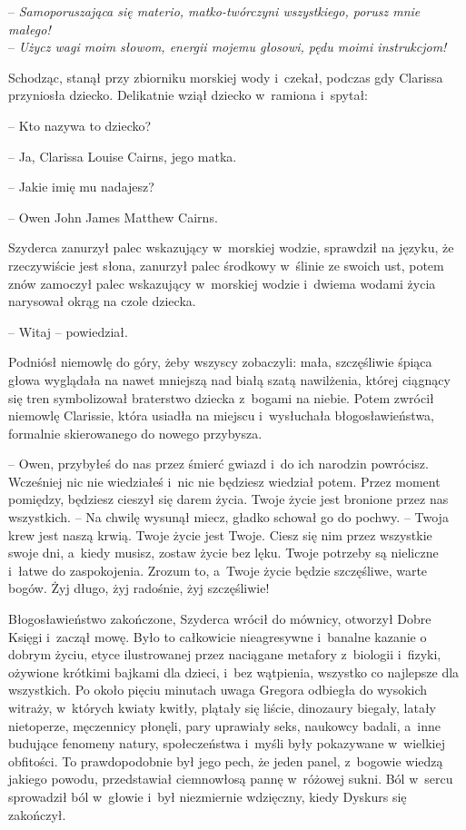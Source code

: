\documentclass[oneside,polish,12pt,sfheadings]{mwbk}
\begin{document}
-- \emph{Samoporuszająca się materio, matko-twórczyni wszystkiego, porusz
mnie małego!}\\

-- \emph{Użycz wagi moim słowom, energii mojemu głosowi, pędu moimi
instrukcjom!}

Schodząc, stanął przy zbiorniku morskiej wody i~czekał, podczas gdy
Clarissa przyniosła dziecko. Delikatnie wziął dziecko w~ramiona i~spytał:

-- Kto nazywa to dziecko?

-- Ja, Clarissa Louise Cairns, jego matka.

-- Jakie imię mu nadajesz?

-- Owen John James Matthew Cairns.

Szyderca zanurzył palec wskazujący w~morskiej wodzie, sprawdził na
języku, że rzeczywiście jest słona, zanurzył palec środkowy w~ślinie ze
swoich ust, potem znów zamoczył palec wskazujący w~morskiej wodzie i~dwiema wodami życia narysował okrąg na czole dziecka.

-- Witaj -- powiedział.

Podniósł niemowlę do góry, żeby wszyscy zobaczyli: mała, szczęśliwie
śpiąca głowa wyglądała na nawet mniejszą nad białą szatą nawilżenia,
której ciągnący się tren symbolizował braterstwo dziecka z~bogami na
niebie. Potem zwrócił niemowlę Clarissie, która usiadła na miejscu i~wysłuchała błogosławieństwa, formalnie skierowanego do nowego przybysza.

-- Owen, przybyłeś do nas przez śmierć gwiazd i~do ich narodzin
powrócisz. Wcześniej nic nie wiedziałeś i~nic nie będziesz wiedział
potem. Przez moment pomiędzy, będziesz cieszył się darem życia. Twoje
życie jest bronione przez nas wszystkich. -- Na chwilę wysunął miecz,
gładko schował go do pochwy. -- Twoja krew jest naszą krwią. Twoje życie
jest Twoje. Ciesz się nim przez wszystkie swoje dni, a~kiedy musisz,
zostaw życie bez lęku. Twoje potrzeby są nieliczne i~łatwe do
zaspokojenia. Zrozum to, a~Twoje życie będzie szczęśliwe, warte bogów.
Żyj długo, żyj radośnie, żyj szczęśliwie!

Błogosławieństwo zakończone, Szyderca wrócił do mównicy, otworzył Dobre
Księgi i~zaczął mowę. Było to całkowicie nieagresywne i~banalne kazanie
o dobrym życiu, etyce ilustrowanej przez naciągane metafory z~biologii i~fizyki, ożywione krótkimi bajkami dla dzieci, i~bez wątpienia, wszystko
co najlepsze dla wszystkich. Po około pięciu minutach uwaga Gregora
odbiegła do wysokich witraży, w~których kwiaty kwitły, plątały się
liście, dinozaury biegały, latały nietoperze, męczennicy płonęli, pary
uprawiały seks, naukowcy badali, a~inne budujące fenomeny natury,
społeczeństwa i~myśli były pokazywane w~wielkiej obfitości. To
prawdopodobnie był jego pech, że jeden panel, z~bogowie wiedzą jakiego
powodu, przedstawiał ciemnowłosą pannę w~różowej sukni. Ból w~sercu
sprowadził ból w~głowie i~był niezmiernie wdzięczny, kiedy Dyskurs się
zakończył.
\end{document}
